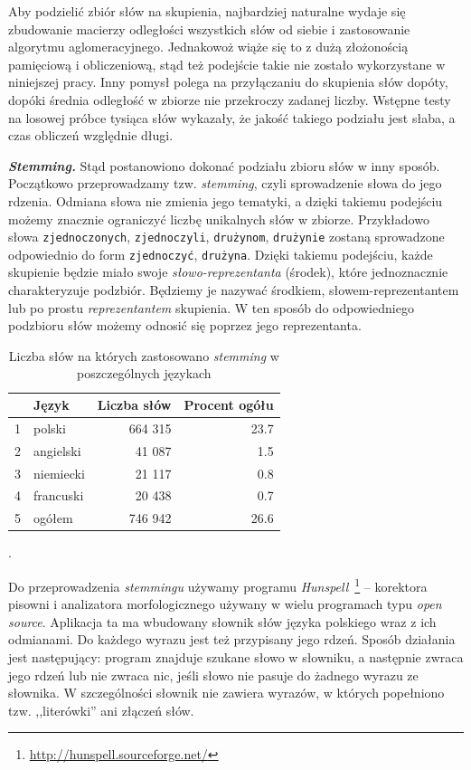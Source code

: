 \documentclass{praca1}
\begin{document}
Aby podzielić zbiór słów na skupienia, najbardziej naturalne wydaje się zbudowanie macierzy odległości wszystkich słów od siebie i zastosowanie algorytmu aglomeracyjnego. Jednakowoż wiąże się to z dużą złożonością pamięciową i obliczeniową, stąd też podejście takie nie zostało wykorzystane w niniejszej pracy. Inny pomysł polega na przyłączaniu do skupienia słów dopóty, dopóki średnia odległość w zbiorze nie przekroczy zadanej liczby. Wstępne testy na losowej próbce tysiąca słów wykazały, że jakość takiego podziału jest słaba, a czas obliczeń względnie długi.

\emph{\textbf{Stemming.}}
Stąd postanowiono dokonać podziału zbioru słów w inny sposób. Początkowo przeprowadzamy tzw. \emph{stemming}, czyli sprowadzenie słowa do jego rdzenia. Odmiana słowa nie zmienia jego tematyki, a dzięki takiemu podejściu możemy znacznie ograniczyć liczbę unikalnych słów w zbiorze. Przykładowo słowa \verb|zjednoczonych|, \verb|zjednoczyli|, \verb|drużynom|, \verb|drużynie| zostaną sprowadzone odpowiednio do form \verb|zjednoczyć|, \verb|drużyna|. Dzięki takiemu podejściu, każde skupienie będzie miało swoje \emph{słowo-reprezentanta} (środek), które jednoznacznie charakteryzuje podzbiór. Będziemy je nazywać środkiem, słowem-reprezentantem lub po prostu \emph{reprezentantem} skupienia. W ten sposób do odpowiedniego podzbioru słów możemy odnosić się poprzez jego reprezentanta.

\begin{table}[!h]
\centering
\begin{tabular}{|rl|rr|}
  \hline
 & Język & Liczba słów & Procent ogółu\\ 
  \hline
1 & polski & 664 315 & 23.7 \\ 
  2 & angielski & 41 087 & 1.5 \\ 
  3 & niemiecki & 21 117 & 0.8 \\ 
  4 & francuski & 20 438 & 0.7 \\ \hline
  5 & ogółem & 746 942 & 26.6 \\ 
   \hline
\end{tabular}
\caption{Liczba słów na których zastosowano \emph{stemming} w poszczególnych językach}.
\label{tab:002}
\end{table}

Do przeprowadzenia \emph{stemmingu} używamy programu \emph{Hunspell}~\footnote{\url{http://hunspell.sourceforge.net/}} -- korektora pisowni i analizatora morfologicznego używany w wielu programach typu \emph{open source}. Aplikacja ta ma wbudowany słownik słów języka polskiego wraz z ich odmianami. Do każdego wyrazu jest też przypisany jego rdzeń. Sposób działania jest następujący: program znajduje szukane słowo w słowniku, a następnie zwraca jego rdzeń lub nie zwraca nic, jeśli słowo nie pasuje do żadnego wyrazu ze słownika. W szczególności słownik nie zawiera wyrazów, w których popełniono tzw. ,,literówki'' ani złączeń słów.
\end{document}

